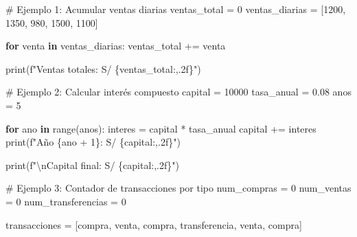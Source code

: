 \documentclass[
  doc,
  floatsintext,
  longtable,
  a4paper,
  nolmodern,
  notxfonts,
  notimes,
  12pt,
  colorlinks=true,linkcolor=blue,citecolor=blue,urlcolor=blue]{apa7}
\newenvironment{Shaded}{\begin{snugshade}}{\end{snugshade}}
\newcommand{\BuiltInTok}[1]{\textcolor[rgb]{0.00,0.23,0.31}{#1}}
\newcommand{\CharTok}[1]{\textcolor[rgb]{0.13,0.47,0.30}{#1}}
\newcommand{\CommentTok}[1]{\textcolor[rgb]{0.37,0.37,0.37}{#1}}
\newcommand{\ControlFlowTok}[1]{\textcolor[rgb]{0.00,0.23,0.31}{\textbf{#1}}}
\newcommand{\DecValTok}[1]{\textcolor[rgb]{0.68,0.00,0.00}{#1}}
\newcommand{\FloatTok}[1]{\textcolor[rgb]{0.68,0.00,0.00}{#1}}
\newcommand{\KeywordTok}[1]{\textcolor[rgb]{0.00,0.23,0.31}{\textbf{#1}}}
\newcommand{\NormalTok}[1]{\textcolor[rgb]{0.00,0.23,0.31}{#1}}
\newcommand{\OperatorTok}[1]{\textcolor[rgb]{0.37,0.37,0.37}{#1}}
\newcommand{\SpecialCharTok}[1]{\textcolor[rgb]{0.37,0.37,0.37}{#1}}
\newcommand{\SpecialStringTok}[1]{\textcolor[rgb]{0.13,0.47,0.30}{#1}}
\newcommand{\StringTok}[1]{\textcolor[rgb]{0.13,0.47,0.30}{#1}}
\begin{document}
\begin{Shaded}
\begin{Highlighting}[]
\CommentTok{\# Ejemplo 1: Acumular ventas diarias}
\NormalTok{ventas\_total }\OperatorTok{=} \DecValTok{0}
\NormalTok{ventas\_diarias }\OperatorTok{=}\NormalTok{ [}\DecValTok{1200}\NormalTok{, }\DecValTok{1350}\NormalTok{, }\DecValTok{980}\NormalTok{, }\DecValTok{1500}\NormalTok{, }\DecValTok{1100}\NormalTok{]}

\ControlFlowTok{for}\NormalTok{ venta }\KeywordTok{in}\NormalTok{ ventas\_diarias:}
\NormalTok{    ventas\_total }\OperatorTok{+=}\NormalTok{ venta}

\BuiltInTok{print}\NormalTok{(}\SpecialStringTok{f"Ventas totales: S/ }\SpecialCharTok{\{}\NormalTok{ventas\_total}\SpecialCharTok{:,.2f\}}\SpecialStringTok{"}\NormalTok{)}

\CommentTok{\# Ejemplo 2: Calcular interés compuesto}
\NormalTok{capital }\OperatorTok{=} \DecValTok{10000}
\NormalTok{tasa\_anual }\OperatorTok{=} \FloatTok{0.08}
\NormalTok{anos }\OperatorTok{=} \DecValTok{5}

\ControlFlowTok{for}\NormalTok{ ano }\KeywordTok{in} \BuiltInTok{range}\NormalTok{(anos):}
\NormalTok{    interes }\OperatorTok{=}\NormalTok{ capital }\OperatorTok{*}\NormalTok{ tasa\_anual}
\NormalTok{    capital }\OperatorTok{+=}\NormalTok{ interes}
    \BuiltInTok{print}\NormalTok{(}\SpecialStringTok{f"Año }\SpecialCharTok{\{}\NormalTok{ano }\OperatorTok{+} \DecValTok{1}\SpecialCharTok{\}}\SpecialStringTok{: S/ }\SpecialCharTok{\{}\NormalTok{capital}\SpecialCharTok{:,.2f\}}\SpecialStringTok{"}\NormalTok{)}

\BuiltInTok{print}\NormalTok{(}\SpecialStringTok{f"}\CharTok{\textbackslash{}n}\SpecialStringTok{Capital final: S/ }\SpecialCharTok{\{}\NormalTok{capital}\SpecialCharTok{:,.2f\}}\SpecialStringTok{"}\NormalTok{)}

\CommentTok{\# Ejemplo 3: Contador de transacciones por tipo}
\NormalTok{num\_compras }\OperatorTok{=} \DecValTok{0}
\NormalTok{num\_ventas }\OperatorTok{=} \DecValTok{0}
\NormalTok{num\_transferencias }\OperatorTok{=} \DecValTok{0}

\NormalTok{transacciones }\OperatorTok{=}\NormalTok{ [}\StringTok{\textquotesingle{}compra\textquotesingle{}}\NormalTok{, }\StringTok{\textquotesingle{}venta\textquotesingle{}}\NormalTok{, }\StringTok{\textquotesingle{}compra\textquotesingle{}}\NormalTok{, }\StringTok{\textquotesingle{}transferencia\textquotesingle{}}\NormalTok{, }\StringTok{\textquotesingle{}venta\textquotesingle{}}\NormalTok{, }\StringTok{\textquotesingle{}compra\textquotesingle{}}\NormalTok{]}


\end{Highlighting}
\end{Shaded}
\end{document}
